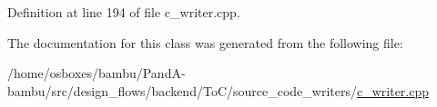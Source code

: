 Definition at line 194 of file c\+\_\+writer.\+cpp.



The documentation for this class was generated from the following file\+:\begin{DoxyCompactItemize}
\item 
/home/osboxes/bambu/\+Pand\+A-\/bambu/src/design\+\_\+flows/backend/\+To\+C/source\+\_\+code\+\_\+writers/\hyperlink{c__writer_8cpp}{c\+\_\+writer.\+cpp}\end{DoxyCompactItemize}
